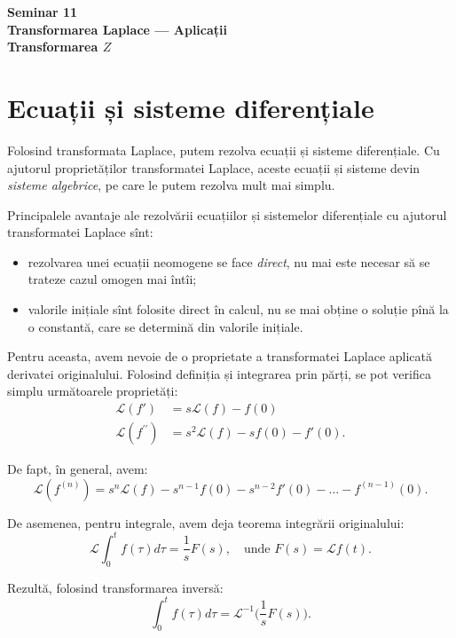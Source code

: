 \documentclass[12pt,a4paper]{article}
\newcommand\Lap{\mathcal{L}}
\theoremstyle{dotless}
\theoremstyle{dotlessdr}
\begin{document}

\begin{center}
  {\large\textbf{Seminar 11 \\
      Transformarea Laplace --- Aplicații \\
      Transformarea $ Z $}}
\end{center}

\vspace{2cm}

\section*{Ecuații și sisteme diferențiale}

\indent\indent Folosind transformata Laplace, putem rezolva ecuații și sisteme
diferențiale. Cu ajutorul proprietăților transformatei Laplace, aceste ecuații
și sisteme devin \emph{sisteme algebrice}, pe care le putem rezolva mult mai
simplu.

Principalele avantaje ale rezolvării ecuațiilor și sistemelor diferențiale cu
ajutorul transformatei Laplace sînt:
\begin{itemize}
\item rezolvarea unei ecuații neomogene se face \emph{direct}, nu mai este necesar
  să se trateze cazul omogen mai întîi;
\item valorile inițiale sînt folosite direct în calcul, nu se mai obține o soluție
  pînă la o constantă, care se determină din valorile inițiale.
\end{itemize}

Pentru aceasta, avem nevoie de o proprietate a transformatei Laplace aplicată
derivatei originalului. Folosind definiția și integrarea prin părți, se pot verifica
simplu următoarele proprietăți:
\begin{align*}
  \Lap (f') &= s \Lap (f) - f(0) \\
  \Lap (f^{\prime\prime}) &= s^2 \Lap (f) - sf(0) - f'(0).
\end{align*}

De fapt, în general, avem:
\[
  \Lap (f^{(n)}) = s^n \Lap (f) - s^{n-1} f(0) - s^{n-2} f'(0) - \dots - %
  f^{(n-1)}(0).
\]

De asemenea, pentru integrale, avem deja teorema integrării originalului:
\[
  \Lap \int_0^t f(\tau) d\tau = \frac{1}{s} F(s), \quad \text{unde } %
  F(s) = \Lap f(t).
\]

Rezultă, folosind transformarea inversă:
\[
  \int_0^t f(\tau) d\tau = \Lap^{-1} \Big( \frac{1}{s} F(s) \Big).
\]
\end{document}
